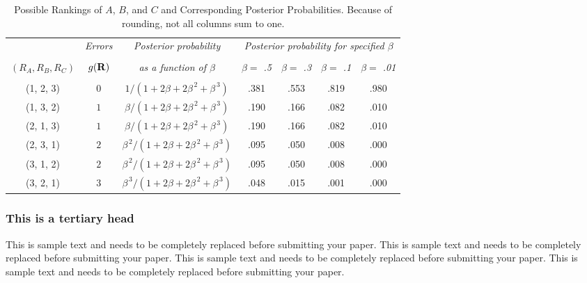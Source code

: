 \documentclass{asaproc}
\begin{document}
\begin{table*}
\caption{\enspace Possible Rankings of $A$, $B$, and $C$ and Corresponding 
Posterior Probabilities.  Because of rounding, not all columns sum to 
one.}\label{tab1}
\begin{tabular*}{\hsize}{@{\extracolsep{\fill}}ccccccc}
\\[-5pt]
                 & 
\multicolumn{1}{c}{\it Errors} & 
\multicolumn{1}{c}{\it Posterior probability} & 
\multicolumn{4}{c}{\it Posterior probability for specified $\beta$}\\
\cline{4-7}
\\[-7pt]
\multicolumn{1}{c}{\it $(R_A,R_B,R_C)$}  & 
\multicolumn{1}{c}{\it $g({\bf R})$} & 
\multicolumn{1}{c}{\it as a function of $\beta$} & 
\multicolumn{1}{c}{\it $\beta =$ .5} & 
\multicolumn{1}{c}{\it $\beta =$ .3} & 
\multicolumn{1}{c}{\it $\beta =$ .1} & 
\multicolumn{1}{c}{\it $\beta =$ .01}\\
\hline
\\[-5pt]
(1, 2, 3)& $0$ & $1 / (1 + 2\beta + 2\beta^{\,2} + \beta^{\,3})$ & 
        .381 & .553 & .819 & .980 \\ 
(1, 3, 2)& $1$ & $\beta/ (1 + 2\beta + 2\beta^{\,2} + \beta^{\,3})$ & 
        .190 & .166 & .082 & .010 \\
(2, 1, 3)& $1$ & $\beta/ (1 + 2\beta + 2\beta^{\,2} + \beta^{\,3})$ & 
        .190 & .166 & .082 & .010 \\
(2, 3, 1)& $2$ & $\beta^{\,2}/ (1 + 2\beta + 2\beta^{\,2} + \beta^{\,3})$ & 
        .095 & .050 & .008 & .000 \\
(3, 1, 2)& $2$ & $\beta^{\,2}/ (1 + 2\beta + 2\beta^{\,2} + \beta^{\,3})$ &  
         .095 &  .050 &  .008 &  .000 \\
(3, 2, 1)& $3$ & $\beta^{\,3}/ (1 + 2\beta + 2\beta^{\,2} + \beta^{\,3})$ & 
         .048 &  .015 &  .001 &   .000 \\
\hline
\end{tabular*}
\end{table*} 

\subsubsection{This is a tertiary head} 

This is sample text and needs to be completely replaced before submitting your paper. This is sample text and needs to be completely replaced before submitting your paper. This is sample text and needs to be completely replaced before submitting your paper. This is sample text and needs to be completely replaced before submitting your paper.
\end{document}
